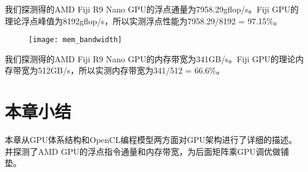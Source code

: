 我们探测得的AMD Fiji R9 Nano GPU的浮点通量为7958.29gflop/s。Fiji GPU的理论浮点峰值为8192gflop/s，所以实测浮点性能为7958.29/8192 = 97.15\%。

\begin{figure}[htbp]
	\centering
	\texttt{[image: mem\_bandwidth]}
	\label{fig:mem_bandwidth}
\end{figure}

我们探测得的AMD Fiji R9 Nano GPU的内存带宽为341GB/s。Fiji GPU的理论内存带宽为512GB/s，所以实测内存带宽为341/512 = 66.6\%。



\section{本章小结}
本章从GPU体系结构和OpenCL编程模型两方面对GPU架构进行了详细的描述。并探测了AMD GPU的浮点指令通量和内存带宽，为后面矩阵乘GPU调优做铺垫。


